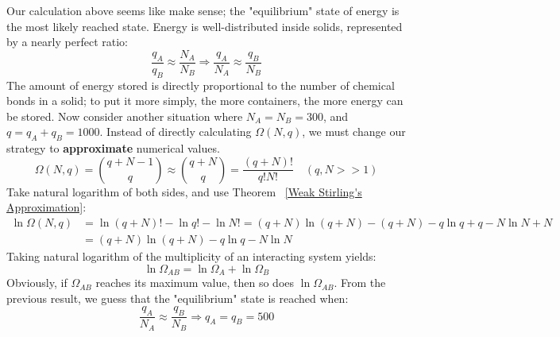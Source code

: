 \documentclass[~/PhyAI/phyai.tex]{subfiles}
\begin{document}
Our calculation above seems like make sense; the "equilibrium" state of energy is the most likely reached state. Energy is well-distributed inside solids, represented by a nearly perfect ratio:
$$ \frac{q_{A}}{q_{B} }\approx \frac{N_{A} }{N_{B}} \Rightarrow \frac{q_{A} }{N_{A}}\approx \frac{q_{B} }{N_{B}}$$
The amount of energy stored is directly proportional to the number of chemical bonds in a solid; to put it more simply, the more containers, the more energy can be stored. Now consider another situation where $N_{A}=N_{B}=300$, and $q=q_{A}+q_{B}=1000$. Instead of directly calculating $\Omega(N,q)$, we must change our strategy to \textbf{approximate} numerical values.
$$ \Omega(N,q)=\binom{q+N-1}{q}\approx\binom{q+N}{q}=\frac{(q+N)! }{q!N!}\quad(q,N>>1)$$
Take natural logarithm of both sides, and use Theorem ~\ref{Weak Stirling's Approximation}:
\begin{equation*}
	\begin{split}
		\ln{\Omega(N,q)}&=\ln{(q+N)!}-\ln{q!}-\ln{N!}=(q+N)\ln{(q+N)}-(q+N)-q\ln{q}+q-N\ln{N}+N\\
		&=(q+N)\ln{(q+N)}-q\ln{q}-N\ln{N}
	\end{split}
\end{equation*}
Taking natural logarithm of the multiplicity of an interacting system yields:
\begin{equation*}
	\ln{\Omega_{AB}}=\ln{\Omega_{A}}+\ln{\Omega_{B}}
\end{equation*}
Obviously, if $\Omega_{AB}$ reaches its maximum value, then so does $\ln{\Omega_{AB}}$. From the previous result, we guess that the "equilibrium" state is reached when:
$$ \frac{q_{A} }{N_{A}}\approx \frac{q_{B}}{N_{B}}\Rightarrow q_{A}=q_{B}=500 $$
\end{document}
